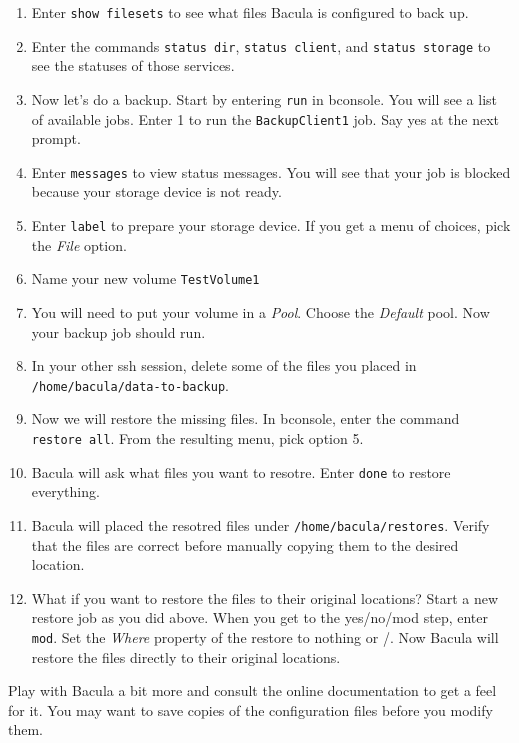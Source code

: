 \documentclass{article}   	%
\begin{document}
\begin{enumerate}
  \item Enter \texttt{show filesets} to see what files Bacula is configured to back up.

  \item Enter the commands \texttt{status dir}, \texttt{status client}, and \texttt{status storage} to see the statuses of those services.

  \item Now let's do a backup.  Start by entering \texttt{run} in bconsole.  You will see a list of available jobs.  Enter 1 to run the 
        \texttt{BackupClient1} job.  Say yes at the next prompt.

  \item Enter \texttt{messages} to view status messages.  You will see that your job is blocked because your storage device is not ready.

  \item Enter \texttt{label} to prepare your storage device. If you get a menu of choices, pick the \emph{File} option.

  \item Name your new volume \texttt{TestVolume1}

  \item You will need to put your volume in a \emph{Pool}.  Choose the \emph{Default} pool.  Now your backup job should run.

  \item In your other ssh session, delete some of the files you placed in \texttt{/home/bacula/data-to-backup}.

  \item Now we will restore the missing files.  In bconsole, enter the command \texttt{restore all}.  From the 
        resulting menu, pick option 5.

  \item Bacula will ask what files you want to resotre.  Enter \texttt{done} to restore everything.

  \item Bacula will placed the resotred files under \texttt{/home/bacula/restores}.  Verify that the files are correct
        before manually copying them to the desired location.

  \item What if you want to restore the files to their original locations?  Start a new restore job as you did above.
        When you get to the yes/no/mod step, enter \texttt{mod}. Set the \emph{Where} property of the restore to 
	nothing or /.  Now Bacula will restore the files directly to their original locations. 

\end{enumerate}

Play with Bacula a bit more and consult the online documentation to get a feel for it.  You may want to save copies of the configuration files 
before you modify them.
\end{document}
